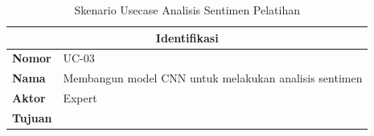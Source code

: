\begin{longtable}[c]{|ll|}
  \caption{Skenario Usecase Analisis Sentimen Pelatihan}
  \label{tab:scenario_usecase_train}                                                                                                                                                                                                                                                                                                                                                 \\
  \hline
  \multicolumn{2}{|c|}{\textbf{Identifikasi}}                                                                                                                                                                                                                                                                                                                                        \\ \hline
  \endhead
  \multicolumn{1}{|l|}{\textbf{Nomor}}                                                        &
  UC-03                                                                                                                                                                                                                                                                                                                                                                              \\ \hline
  \multicolumn{1}{|l|}{\textbf{Nama}}                                                         &
  Membangun model CNN untuk melakukan analisis sentimen                                                                                                                                                                                                                                                                                                                              \\ \hline
  \multicolumn{1}{|l|}{\textbf{Aktor}}                                                        &
  Expert                                                                                                                                                                                                                                                                                                                                                                             \\ \hline
  \multicolumn{1}{|l|}{\textbf{Tujuan}}                                                       &

\end{longtable}
